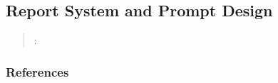



\subsection{Report System and Prompt Design}
\label{sec:report-system-and-prompt-design}

\begin{quote}
\summary: 
\end{quote}



\subsubsection{References}





